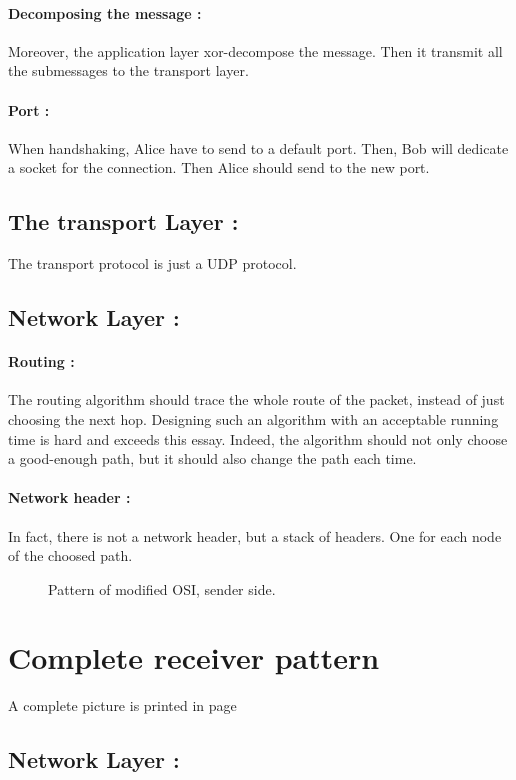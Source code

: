 \documentclass[a4paper, onecolumn, 10pt]{article}
\numberwithin{equation}{section}
\begin{document}
\paragraph{Decomposing the message :}
Moreover, the application layer xor-decompose the message. Then it transmit all the submessages to the transport layer.
\paragraph{Port :}
When handshaking, Alice have to send to a default port. Then, Bob will dedicate a socket for the connection. Then Alice should send to the new port.
\subsection{The transport Layer :}
The transport protocol is just a UDP protocol.
\subsection{Network Layer :}
\paragraph{Routing :}
The routing algorithm should trace the whole route of the packet, instead of just choosing the next hop. Designing such an algorithm with an acceptable running time is hard and exceeds this essay. Indeed, the algorithm should not only choose a good-enough path, but it should also change the path each time. 
\paragraph{Network header :}
In fact, there is not a network header, but a stack of headers. One for each node of the choosed path.
\begin{figure}
  \centering
  \begingroup
  
  \endgroup
  \caption{Pattern of modified OSI, sender side.}
  \label{fig:OSImodified}
\end{figure}

\section{Complete receiver pattern}
A complete picture is printed in page \pageref{fig:OSImodified2}
\subsection{Network Layer :}
\end{document}
